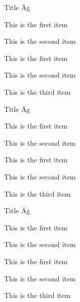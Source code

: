 \documentclass[a4paper, 10pt]{extarticle}
\begin{document}
\newpage
\lipsum[1]
\begin{fancyblock}[blue]{Title \"Ag}
\begin{fancylist}
\item This is the first item
\item This is the second item
\begin{fancylist}
\item This is the first item
\item This is the second item
\end{fancylist}
\item This is the third item
\end{fancylist}
\end{fancyblock}
\begin{fancyblock*}[blue]{Title \"Ag}
\noindent
\begin{fancylist}
\item This is the first item
\item This is the second item
\begin{fancylist}
\item This is the first item
\item This is the second item
\end{fancylist}
\item This is the third item
\end{fancylist}
\end{fancyblock*}
\begin{fancyblock+}[blue]{Title \"Ag}
\begin{fancylist}
\item This is the first item
\item This is the second item
\begin{fancylist}
\item This is the first item
\item This is the second item
\end{fancylist}
\item This is the third item
\end{fancylist}
\end{fancyblock+}
\lipsum[1]

\newpage
\end{document}
